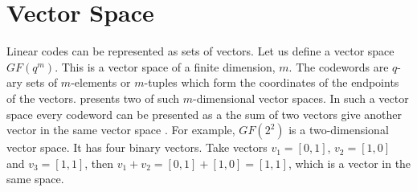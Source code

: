 \documentclass[../main.tex]{subfiles}
\begin{document}
    \newpage


    \section{Vector Space}
    Linear codes can be represented as sets of vectors. Let us define a vector space $GF(q^m)$. This is a vector space of a finite dimension, $m$. The codewords are $q$-ary sets of $m$-elements or $m$-tuples which form the coordinates of the endpoints of the vectors.  presents two of such $m$-dimensional vector spaces. In such a vector space every codeword can be presented as a the sum of two vectors give another vector in the same vector space \autocite{bose2008information}. For example, $GF(2^2)$ is a two-dimensional vector space. It has four binary vectors. Take vectors $v_1=[0,1]$, $v_2=[1,0]$ and $v_3=[1,1]$, then $v_1+v_2=[0,1]+[1,0]=[1,1]$, which is a vector in the same space.
\end{document}
